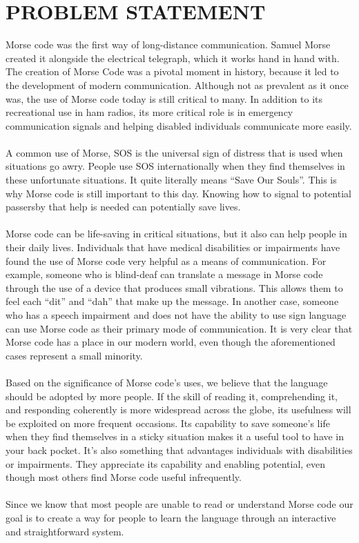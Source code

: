 \documentclass[12pt]{article}
\begin{document}
\section{PROBLEM STATEMENT}
Morse code was the first way of long-distance communication. Samuel Morse created it alongside the electrical telegraph, which it works hand in hand with. The creation of Morse Code was a pivotal moment in history, because it led to the development of modern communication. Although not as prevalent as it once was, the use of Morse code today is still critical to many. In addition to its recreational use in ham radios, its more critical role is in emergency communication signals and helping disabled individuals communicate more easily.\\
\\
A common use of Morse, SOS is the universal sign of distress that is used when situations go awry. People use SOS internationally when they find themselves in these unfortunate situations. It quite literally means “Save Our Souls”. This is why Morse code is still important to this day. Knowing how to signal to potential passersby that help is needed can potentially save lives.\\
\\
Morse code can be life-saving in critical situations, but it also can help people in their daily lives. Individuals that have medical disabilities or impairments have found the use of Morse code very helpful as a means of communication. For example, someone who is blind-deaf can translate a message in Morse code through the use of a device that produces small vibrations. This allows them to feel each “dit” and “dah” that make up the message. In another case, someone who has a speech impairment and does not have the ability to use sign language can use Morse code as their primary mode of communication. It is very clear that Morse code has a place in our modern world, even though the aforementioned cases represent a small minority.\\
\\
Based on the significance of Morse code’s uses, we believe that the language should be adopted by more people. If the skill of reading it, comprehending it, and responding coherently is more widespread across the globe, its usefulness will be exploited on more frequent occasions. Its capability to save someone’s life when they find themselves in a sticky situation makes it a useful tool to have in your back pocket. It’s also something that advantages individuals with disabilities or impairments. They appreciate its capability and enabling potential, even though most others find Morse code useful infrequently.\\
\\
Since we know that most people are unable to read or understand Morse code our goal is to create a way for people to learn the language through an interactive and straightforward system.\\
\\
\end{document}
